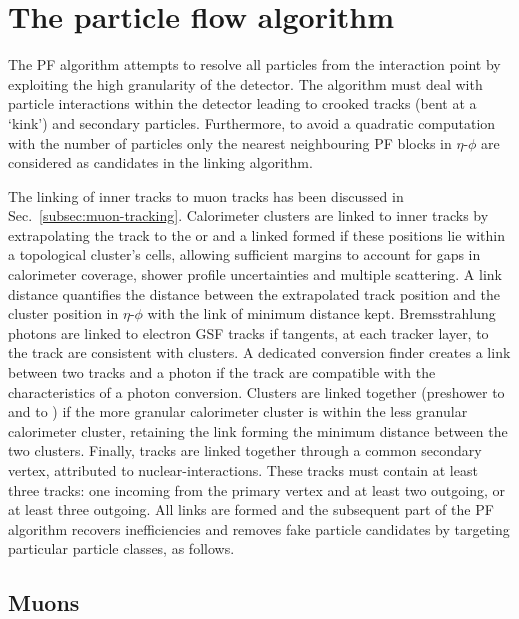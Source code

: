 \section{The particle flow algorithm}

The PF algorithm attempts to resolve all particles from the interaction point
by exploiting the high granularity of the \CMS detector. The algorithm must
deal with particle interactions within the detector leading to crooked tracks
(bent at a `kink') and secondary particles. Furthermore, to avoid a quadratic
computation with the number of particles only the nearest neighbouring PF
blocks in $\eta$-$\phi$ are considered as candidates in the linking algorithm.

The linking of inner tracks to muon tracks has been discussed in
{Sec.~\ref{subsec:muon-tracking}}. Calorimeter clusters are linked to inner
tracks by extrapolating the track to the \ECAL or \HCAL and a linked formed if
these positions lie within a topological cluster's cells, allowing sufficient
margins to account for gaps in calorimeter coverage, shower profile
uncertainties and multiple scattering. A link distance quantifies the distance
between the extrapolated track position and the cluster position in
$\eta$-$\phi$ with the link of minimum distance kept. Bremsstrahlung photons
are linked to electron GSF tracks if tangents, at each tracker layer, to the
track are consistent with \ECAL clusters. A dedicated conversion finder
creates a link between two tracks and a photon if the track are compatible
with the characteristics of a photon conversion. Clusters are linked together
(preshower to \ECAL and \ECAL to \HCAL) if the more granular calorimeter
cluster is within the less granular calorimeter cluster, retaining the link
forming the minimum distance between the two clusters. Finally, tracks are
linked together through a common secondary vertex, attributed to
nuclear-interactions. These tracks must contain at least three tracks: one
incoming from the primary vertex and at least two outgoing, or at least three
outgoing. All links are formed and the subsequent part of the PF algorithm
recovers inefficiencies and removes fake particle candidates by targeting
particular particle classes, as follows.

    
\subsection{Muons}

